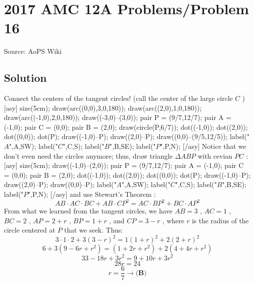 \documentclass[12pt]{article}
\begin{document}
\section*{{2017 AMC 12A Problems/Problem 16}}
Source: AoPS Wiki

\subsection*{Solution}
Connect the centers of the tangent circles! (call the center of the large circle $C$ ) [asy] size(5cm); draw(arc((0,0),3,0,180)); draw(arc((2,0),1,0,180)); draw(arc((-1,0),2,0,180)); draw((-3,0)--(3,0)); pair P = (9/7,12/7); pair A = (-1,0); pair C = (0,0); pair B = (2,0); draw(circle(P,6/7)); dot((-1,0)); dot((2,0)); dot((0,0)); dot(P); draw((-1,0)--P); draw((2,0)--P); draw((0,0)--(9/5,12/5)); label("$A$",A,SW); label("$C$",C,S); label("$B$",B,SE); label("$P$",P,N); [/asy] Notice that we don't even need the circles anymore; thus, draw triangle $\Delta ABP$ with cevian $PC$ : [asy] size(5cm); draw((-1,0)--(2,0)); pair P = (9/7,12/7); pair A = (-1,0); pair C = (0,0); pair B = (2,0); dot((-1,0)); dot((2,0)); dot((0,0)); dot(P); draw((-1,0)--P); draw((2,0)--P); draw((0,0)--P); label("$A$",A,SW); label("$C$",C,S); label("$B$",B,SE); label("$P$",P,N); [/asy] and use Stewart's Theorem : \[AB \cdot AC \cdot BC + AB \cdot {CP}^2 = AC \cdot {BP}^2 + BC \cdot {AP}^2\] From what we learned from the tangent circles, we have $AB = 3$ , $AC = 1$ , $BC = 2$ , $AP = 2 + r$ , $BP = 1 + r$ , and $CP = 3 - r$ , where $r$ is the radius of the circle centered at $P$ that we seek. Thus: \[3 \cdot 1 \cdot 2 + 3 {\left(3-r\right)}^2 = 1 {\left(1+r\right)}^2 + 2 {\left(2+r\right)}^2\] \[6 + 3\left(9 - 6r + r^2\right) = \left(1 + 2r + r^2\right) + 2\left(4 + 4r + r^2\right)\] \[33 - 18r + 3r^2 = 9 + 10r + 3r^2\] \[28r = 24\] \[r = \boxed{\frac{6}{7}} \to \boxed{\textbf{(B)}}\]
\end{document}
